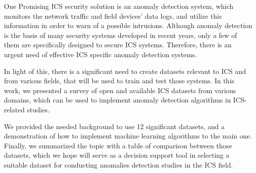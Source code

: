\documentclass[english,12pt]{article}
\begin{document}
One Promising ICS security solution is an anomaly detection system, which monitors the network traffic
and field devices' data logs, and utilize this information in order to warn of a possible intrusions.
Although anomaly detection is the basis of many security systems developed in recent years, only a few
of them are specifically designed to secure ICS systems. Therefore, there is an urgent need of effective
ICS specific anomaly detection systems.

In light of this, there is a significant need to create datasets relevant to ICS and from various fields,
that will be used to train and test those systems.
In this work, we presented a survey of open and available ICS datasets from various
domains, which can be used to implement anomaly detection algorithms in
ICS-related studies.

We provided the needed background to use 12 significant datasets, and a
demonstration of how to implement machine learning algorithms to the main one.
Finally, we summarized the topic with a table of comparison between those datasets, which we hope will
serve as a decision support tool in selecting a suitable dataset for conducting anomalies detection
studies in the ICS field.

\pagebreak{}




\end{document}
